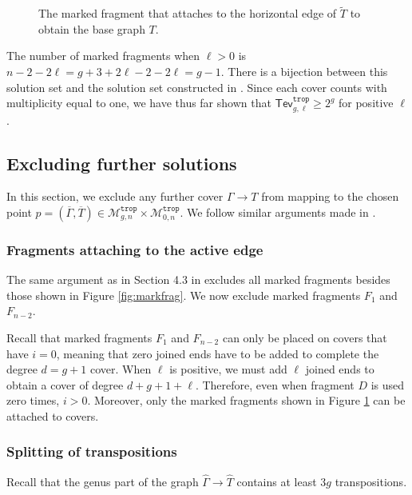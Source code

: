\documentclass[11pt,reqno]{amsart}
\theoremstyle{definition}
\newcommand\trop{{\mathtt{trop}}}
\newcommand\Mgn[1]{\mathcal M_{#1}}
\newcommand{\gGamma}{\widehat{\Gamma}}
\newcommand{\gT}{\widehat{T}}
\newcommand{\Tev}{{\mathsf{Tev}}}
\begin{document}
\begin{figure}[tb]
\begin{tikzpicture}[x=0.65pt,y=0.65pt,yscale=-1,xscale=1]
\end{tikzpicture}
    \caption{The marked fragment that attaches to the horizontal edge of $\tilde{T}$ to obtain the base graph $T$.}
    \label{fig:lpositivefragments}
\end{figure}
The number of marked fragments when $\ell>0$ is $n-2-2\ell=g+3+2\ell-2-2\ell=g-1$. There is a bijection between this solution set and the solution set constructed in \cite{troptev}. Since each cover counts with multiplicity equal to one, we have thus far shown that $\Tev_{g,\ell}^\trop\geq 2^g$ for positive $\ell$.

\subsection{Excluding further solutions} \label{sec:ellposexclude}
In this section, we exclude any further cover $\Gamma \to T$ from mapping to  the chosen point $p= (\overline{\Gamma},\overline{T})\in \Mgn{g,n}^\trop\times \Mgn{0,n}^\trop$. We follow similar arguments made in \cite{troptev}.

\subsubsection*{Fragments attaching to the active edge}
The same argument as in Section 4.3 in \cite{troptev} excludes all marked fragments besides those shown in Figure \ref{fig:markfrag}. We now exclude marked fragments $F_1$ and $F_{n-2}$. 

Recall that marked fragments $F_1$ and $F_{n-2}$ can only be placed on covers that have $i=0$, meaning that zero joined ends have to be added to complete the degree $d=g+1$ cover. When $\ell$ is positive, we must add $\ell$ joined ends to obtain a cover of degree $d+g+1+\ell$. Therefore, even when fragment $D$ is used zero times, $i>0$. Moreover, only the marked fragments shown in Figure \ref{fig:lpositivefragments} can be attached to covers.

\subsubsection*{Splitting of transpositions}
Recall that the genus part of the graph $\gGamma \to \gT $ contains at least $3g$ transpositions. 
\end{document}
